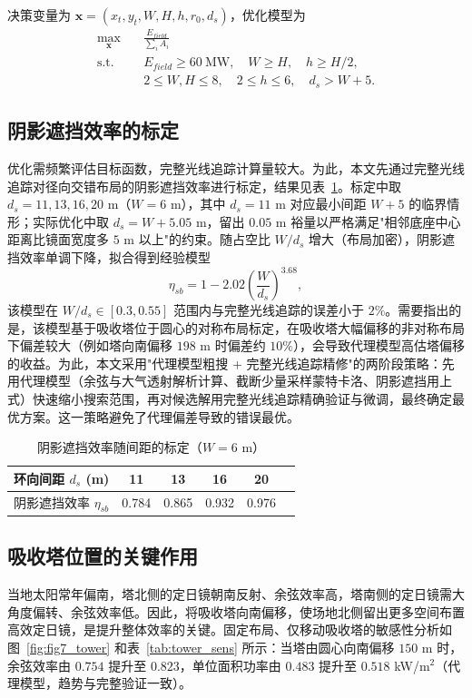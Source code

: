 \documentclass[12pt]{ctexart}
\begin{document}
决策变量为 $\mathbf{x}=(x_t,y_t,W,H,h,r_0,d_s)$，优化模型为
\begin{equation}
\begin{aligned}
\max_{\mathbf{x}}\quad & \frac{E_{field}}{\sum_i A_i} \\
\text{s.t.}\quad & E_{field}\ge 60\ \text{MW},\quad W\ge H,\quad h\ge H/2,\\
& 2\le W,H\le 8,\quad 2\le h\le 6,\quad d_s>W+5.
\end{aligned}
\end{equation}

\subsection{阴影遮挡效率的标定}
优化需频繁评估目标函数，完整光线追踪计算量较大。为此，本文先通过完整光线追踪对径向交错布局的阴影遮挡效率进行标定，结果见表~\ref{tab:sb_calib}。标定中取 $d_s=11,13,16,20$ m（$W=6$ m），其中 $d_s=11$ m 对应最小间距 $W+5$ 的临界情形；实际优化中取 $d_s=W+5.05$ m，留出 $0.05$ m 裕量以严格满足"相邻底座中心距离比镜面宽度多 $5$ m 以上"的约束。随占空比 $W/d_s$ 增大（布局加密），阴影遮挡效率单调下降，拟合得到经验模型
\begin{equation}
\eta_{sb}=1-2.02\left(\frac{W}{d_s}\right)^{3.68},
\end{equation}
该模型在 $W/d_s\in[0.3,0.55]$ 范围内与完整光线追踪的误差小于 $2\%$。需要指出的是，该模型基于吸收塔位于圆心的对称布局标定，在吸收塔大幅偏移的非对称布局下偏差较大（例如塔向南偏移 $198$ m 时偏差约 $10\%$），会导致代理模型高估塔偏移的收益。为此，本文采用"代理模型粗搜 + 完整光线追踪精修"的两阶段策略：先用代理模型（余弦与大气透射解析计算、截断少量采样蒙特卡洛、阴影遮挡用上式）快速缩小搜索范围，再对候选解用完整光线追踪精确验证与微调，最终确定最优方案。这一策略避免了代理偏差导致的错误最优。

\begin{table}[H]
\centering
\begin{tabular}{lccccc}
\toprule
环向间距 $d_s$ (m) & 11 & 13 & 16 & 20 \\
\midrule
阴影遮挡效率 $\eta_{sb}$ & 0.784 & 0.865 & 0.932 & 0.976 \\
\bottomrule
\end{tabular}
\caption{阴影遮挡效率随间距的标定（$W=6$ m）}
\label{tab:sb_calib}
\end{table}

\subsection{吸收塔位置的关键作用}
当地太阳常年偏南，塔北侧的定日镜朝南反射、余弦效率高，塔南侧的定日镜需大角度偏转、余弦效率低。因此，将吸收塔向南偏移，使场地北侧留出更多空间布置高效定日镜，是提升整体效率的关键。固定布局、仅移动吸收塔的敏感性分析如图~\ref{fig:fig7_tower} 和表~\ref{tab:tower_sens} 所示：当塔由圆心向南偏移 $150$ m 时，余弦效率由 $0.754$ 提升至 $0.823$，单位面积功率由 $0.483$ 提升至 $0.518$ kW/m$^2$（代理模型，趋势与完整验证一致）。
\end{document}
